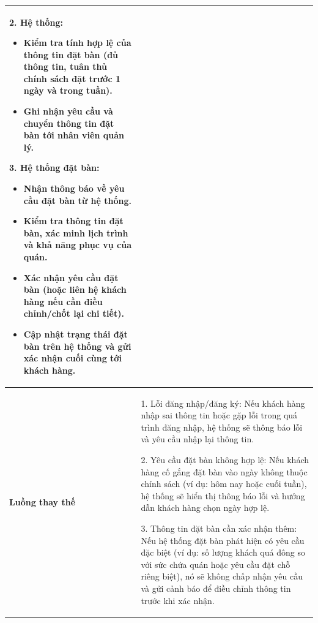 \documentclass[a4paper]{article}
\begin{document}
\begin{itemize}
\begin{table}[H]
\begin{tabular}{|p{3cm}|p{12cm}|}
                2. Hệ thống:
                \begin{itemize}
                    \item Kiểm tra tính hợp lệ của thông tin đặt bàn (đủ thông tin, tuân thủ chính sách đặt trước 1 ngày và trong tuần).
                    \item Ghi nhận yêu cầu và chuyển thông tin đặt bàn tới nhân viên quản lý.
                \end{itemize}
                
                3. Hệ thống đặt bàn:
                \begin{itemize}
                    \item Nhận thông báo về yêu cầu đặt bàn từ hệ thống.
                    \item Kiểm tra thông tin đặt bàn, xác minh lịch trình và khả năng phục vụ của quán.
                    \item Xác nhận yêu cầu đặt bàn (hoặc liên hệ khách hàng nếu cần điều chỉnh/chốt lại chi tiết).
                    \item Cập nhật trạng thái đặt bàn trên hệ thống và gửi xác nhận cuối cùng tới khách hàng.
                \end{itemize} \\
                \hline
                \textbf{Luồng thay thế} & 
                1. Lỗi đăng nhập/đăng ký: Nếu khách hàng nhập sai thông tin hoặc gặp lỗi trong quá trình đăng nhập, hệ thống sẽ thông báo lỗi và yêu cầu nhập lại thông tin.
                
                2. Yêu cầu đặt bàn không hợp lệ: Nếu khách hàng cố gắng đặt bàn vào ngày không thuộc chính sách (ví dụ: hôm nay hoặc cuối tuần), hệ thống sẽ hiển thị thông báo lỗi và hướng dẫn khách hàng chọn ngày hợp lệ.
                
                3. Thông tin đặt bàn cần xác nhận thêm: Nếu hệ thống đặt bàn phát hiện có yêu cầu đặc biệt (ví dụ: số lượng khách quá đông so với sức chứa quán hoặc yêu cầu đặt chỗ riêng biệt), nó sẽ không chấp nhận yêu cầu và gửi cảnh báo để điều chỉnh thông tin trước khi xác nhận. \\
                \hline
            \end{tabular}
            \label{tab:usecase-table}
        \end{table}

\end{itemize}
\end{document}
